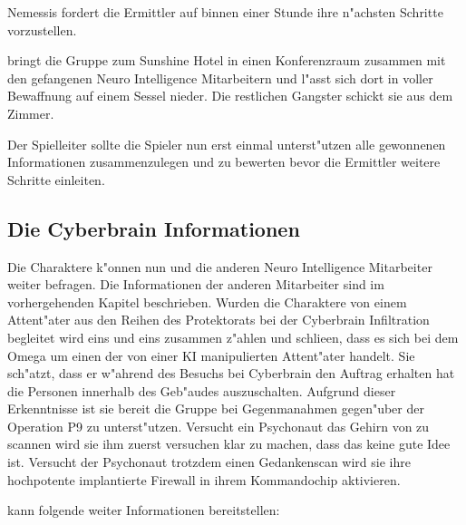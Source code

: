 Nemessis fordert die Ermittler auf binnen einer Stunde ihre n"achsten Schritte vorzustellen. 


\xl{} bringt die Gruppe zum Sunshine Hotel in einen Konferenzraum zusammen mit den gefangenen Neuro Intelligence Mitarbeitern und l"asst sich dort in voller Bewaffnung auf einem Sessel nieder. Die restlichen Gangster schickt sie aus dem Zimmer.

Der Spielleiter sollte die Spieler nun erst einmal unterst"utzen alle gewonnenen Informationen zusammenzulegen und zu bewerten bevor die Ermittler weitere Schritte einleiten. 

\subsection{Die Cyberbrain Informationen} 
Die Charaktere k"onnen nun \ml{} und die anderen Neuro Intelligence Mitarbeiter weiter befragen. Die Informationen der anderen Mitarbeiter sind im vorhergehenden Kapitel beschrieben. Wurden die Charaktere von einem Attent"ater aus den Reihen des Protektorats bei der Cyberbrain Infiltration begleitet wird \ml{} eins und eins zusammen z"ahlen und schlie\3en, dass es sich bei dem Omega um einen der von einer KI manipulierten Attent"ater handelt. Sie sch"atzt, dass er w"ahrend des Besuchs bei Cyberbrain den Auftrag erhalten hat die Personen innerhalb des Geb"audes auszuschalten. Aufgrund dieser Erkenntnisse ist sie bereit die Gruppe bei Gegenma\3nahmen gegen"uber der Operation P9 zu unterst"utzen. Versucht ein Psychonaut das Gehirn von \ml{} zu scannen wird sie ihm zuerst versuchen klar zu machen, dass das keine gute Idee ist. Versucht der Psychonaut trotzdem einen Gedankenscan wird sie ihre hochpotente implantierte Firewall in ihrem Kommandochip aktivieren.

\ml{} kann folgende weiter Informationen bereitstellen:

